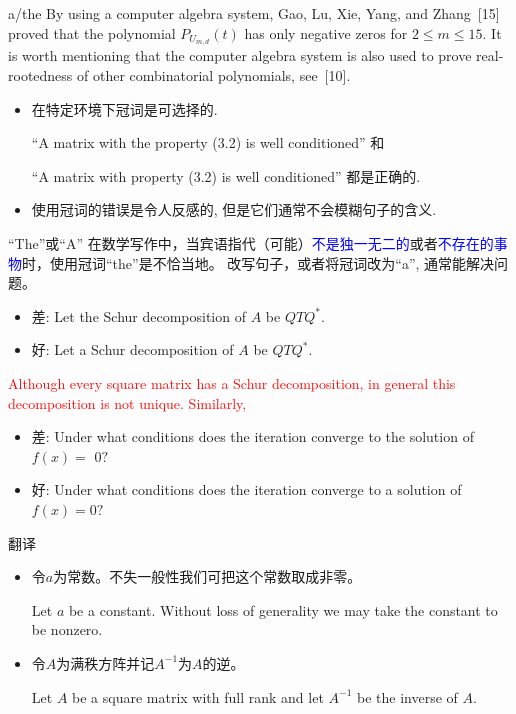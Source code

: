 \documentclass{ctexbeamer}
\newcommand{\red}[1]{\textcolor{red}{#1}}
\newcommand{\blue}[1]{\textcolor{blue}{#1}}
\begin{document}
\begin{frame}{a/the}
    By using \alert{a}  computer algebra system,  Gao,   Lu,  Xie,  Yang, and  Zhang~[15] proved that the polynomial  $P_{U_{m,d}}(t)$ has only negative zeros for $2\leq m\leq 15$.
    It is worth mentioning {that \alert{the} computer algebra system} is also used  to  prove  real-rootedness of  other combinatorial polynomials, see~[10].
\end{frame}


\begin{frame}
\begin{itemize}
	\item 在特定环境下冠词是可选择的.

``A matrix with the property (3.2) is well conditioned''
和

 ``A matrix with property (3.2) is well conditioned''
都是正确的.

 \item 使用冠词的错误是令人反感的, 但是它们通常不会模糊句子的含义.
\end{itemize}

\end{frame}


\begin{frame}{``The''或``A''}
在数学写作中，当宾语指代（可能）\blue{不是独一无二的}或者\blue{不存在的事物}时，使用冠词``the''是不恰当地。
改写句子，或者将冠词改为``a'', 通常能解决问题。
{

\begin{itemize}
\item 差: Let the Schur decomposition of $A$ be $Q T Q^{*}$.
\item 好: Let a Schur decomposition of $A$ be $Q T Q^{*}$.
	\end{itemize}
}

\pause
\red{
Although every square matrix has a Schur decomposition, in general this decomposition is not unique.  Similarly, }


\begin{itemize}
\item 差: Under what conditions does the iteration converge to the solution of $f(x)=$
$0 ?$  \pause

\item  好: Under what conditions does the iteration converge to a solution of $f(x)=0 ?$
\end{itemize}
\end{frame}

\begin{frame}{翻译}
\begin{itemize}
\item
    令$a$为常数。不失一般性我们可把这个常数取成非零。
\pause

Let $a$ be \alert{a} constant. Without loss of generality we may take \alert{the} constant to be nonzero.
\item
    令$A$为满秩方阵并记$A^{-1}$为$A$的逆。

    \pause
Let $A$ be \alert{a} square matrix with full rank and let $A^{-1}$ be \alert{the} inverse of $A$.
\end{itemize}
\end{frame}
\end{document}
